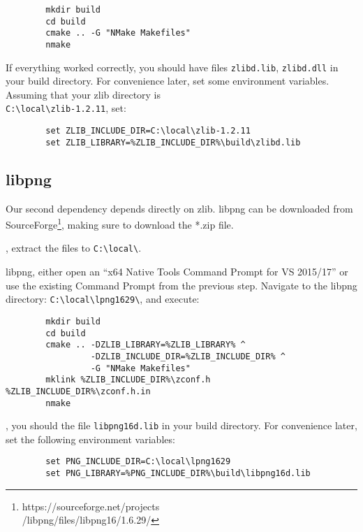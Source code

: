 \documentclass{tufte-handout}
\begin{document}
    \begin{lstlisting}
        mkdir build
        cd build 
        cmake .. -G "NMake Makefiles"
        nmake
    \end{lstlisting}

    If everything worked correctly, you should have files \Verb|zlibd.lib|, \Verb|zlibd.dll| in
    your build directory.  For convenience later, set some environment variables.  Assuming that
    your zlib directory is \\
    \Verb|C:\local\zlib-1.2.11|, set:

    \begin{lstlisting}
        set ZLIB_INCLUDE_DIR=C:\local\zlib-1.2.11
        set ZLIB_LIBRARY=%ZLIB_INCLUDE_DIR%\build\zlibd.lib
    \end{lstlisting}

\subsection{libpng}

    Our second dependency depends directly on zlib.  libpng can be downloaded from 
    SourceForge\footnote{https://sourceforge.net/projects \\
    /libpng/files/libpng16/1.6.29/}, making 
    sure to download the *.zip file.

    , extract the files to \Verb|C:\local\|.

     libpng, either open an ``x64 Native Tools Command Prompt for VS 2015/17''
    or use the existing Command Prompt from the previous step.  Navigate to the libpng directory:
    \Verb|C:\local\lpng1629\|, and execute:

    \begin{lstlisting}
        mkdir build
        cd build
        cmake .. -DZLIB_LIBRARY=%ZLIB_LIBRARY% ^ 
                 -DZLIB_INCLUDE_DIR=%ZLIB_INCLUDE_DIR% ^
                 -G "NMake Makefiles"
        mklink %ZLIB_INCLUDE_DIR%\zconf.h %ZLIB_INCLUDE_DIR%\zconf.h.in
        nmake
    \end{lstlisting}

    , you should the file \Verb|libpng16d.lib| in your build directory.
    For convenience later, set the following environment variables:

    \begin{lstlisting}
        set PNG_INCLUDE_DIR=C:\local\lpng1629
        set PNG_LIBRARY=%PNG_INCLUDE_DIR%\build\libpng16d.lib
    \end{lstlisting}
\end{document}
